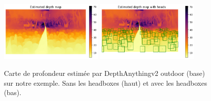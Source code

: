 \begin{figure}[h!]
    \centering
    \includegraphics[width=0.45\textwidth]{images/depth_map.png}
    \includegraphics[width=0.45\textwidth]{images/depth_map_with_heads.png}
    \caption{Carte de profondeur estimée par DepthAnythingv2 outdoor (base) sur notre exemple. Sans les headboxes (haut) et avec les headboxes (bas).}
    \label{fig:depth-estimation-exemple}
\end{figure}



